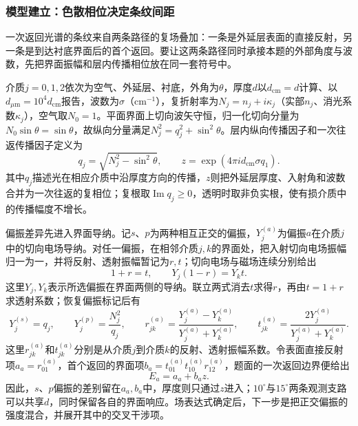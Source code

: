 \subsubsection{模型建立：色散相位决定条纹间距}

一次返回光谱的条纹来自两条路径的复场叠加：一条是外延层表面的直接反射，另一条是到达衬底界面后的首个返回。要让这两条路径同时承接本题的外部角度与波数，先把界面振幅和层内传播相位放在同一套符号中。

介质$j=0,1,2$依次为空气、外延层、衬底，外角为$\theta$，厚度$d$以$d_{\mathrm{cm}}=d$计算、以$d_{\mu\mathrm{m}}=10^4d_{\mathrm{cm}}$报告，波数为$\sigma$（$\mathrm{cm}^{-1}$），复折射率为$N_j=n_j+i\kappa_j$（实部$n_j$、消光系数$\kappa_j$），空气取$N_0=1$。平面界面上切向波矢守恒，归一化切向分量为$N_0\sin\theta=\sin\theta$，故纵向分量满足$N_j^2=q_j^2+\sin^2\theta$。层内纵向传播因子和一次往返传播因子定义为
\begin{equation}
q_j=\sqrt{N_j^2-\sin^2\theta},\qquad
z=\exp\!\left(4\pi i d_{\mathrm{cm}}\sigma q_1\right).
\end{equation}
其中$q_j$描述光在相应介质中沿厚度方向的传播，$z$则把外延层厚度、入射角和波数合并为一次往返的复相位；复根取$\operatorname{Im}q_j\geq0$，透明时取非负实根，使有损介质中的传播幅度不增长。

偏振差异先进入界面导纳。记$s$、$p$为两种相互正交的偏振，$Y_j^{(a)}$为偏振$a$在介质$j$中的切向电场导纳。对任一偏振，在相邻介质$j,k$的界面处，把入射切向电场振幅归一为一，并将反射、透射振幅暂记为$r,t$；切向电场与磁场连续分别给出
\begin{equation}
1+r=t,\qquad Y_j(1-r)=Y_kt.
\end{equation}
这里$Y_j,Y_k$表示所选偏振在界面两侧的导纳。联立两式消去$t$求得$r$，再由$t=1+r$求透射系数；恢复偏振标记后有
\begin{equation}
Y_j^{(s)}=q_j,\qquad Y_j^{(p)}=\frac{N_j^2}{q_j},\qquad
r_{jk}^{(a)}=\frac{Y_j^{(a)}-Y_k^{(a)}}{Y_j^{(a)}+Y_k^{(a)}},\qquad
t_{jk}^{(a)}=\frac{2Y_j^{(a)}}{Y_j^{(a)}+Y_k^{(a)}}.
\end{equation}
这里$r_{jk}^{(a)}$和$t_{jk}^{(a)}$分别是从介质$j$到介质$k$的反射、透射振幅系数。令表面直接反射项$a_a=r_{01}^{(a)}$，首个返回的界面项$b_a=t_{01}^{(a)}t_{10}^{(a)}r_{12}^{(a)}$，题面的一次返回边界便给出
\begin{equation}
E_a=a_a+b_a z .
\end{equation}
因此，$s$、$p$偏振的差别留在$a_a,b_a$中，厚度则只通过$z$进入；$10^\circ$与$15^\circ$两条观测支路可以共享$d$，同时保留各自的界面响应。场表达式确定后，下一步是把正交偏振的强度混合，并展开其中的交叉干涉项。


